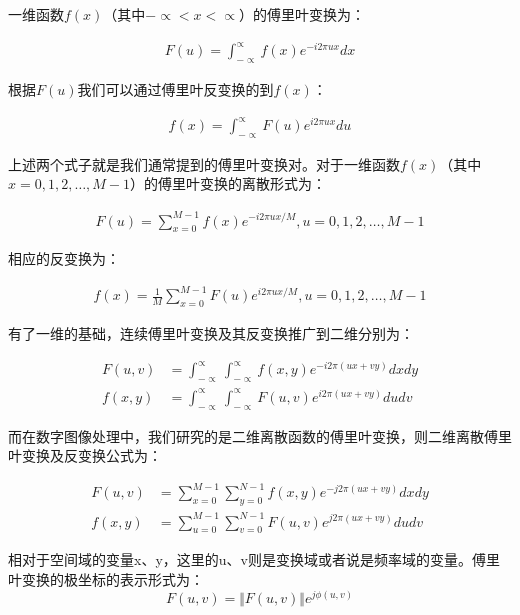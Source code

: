 一维函数$f(x)$（其中$-\propto<x<\propto$）的傅里叶变换为：
\begin{linenomath}
\begin{align}
F(u)=\int^{\propto}_{-\propto}f(x)e^{-i2\pi ux}dx
\label{式2_14}
\end{align}
\end{linenomath}
根据$F(u)$我们可以通过傅里叶反变换的到$f(x)$：
\begin{linenomath}
\begin{align}
f(x)=\int^{\propto}_{-\propto}F(u)e^{i2\pi ux}du
\label{式2_15}
\end{align}
\end{linenomath}
上述两个式子就是我们通常提到的傅里叶变换对。对于一维函数$f(x)$（其中$x=0,1,2,\dots,M-1$）的傅里叶变换的离散形式为：
\begin{linenomath}
\begin{align}
F(u)=\sum^{M-1}_{x=0}f(x)e^{-i2\pi ux/M}, u=0,1,2,\dots,M-1
\label{式2_16}
\end{align}
\end{linenomath}
相应的反变换为：
\begin{linenomath}
\begin{align}
f(x)=\frac{1}{M}\sum^{M-1}_{x=0}F(u)e^{i2\pi ux/M},u=0,1,2,\dots,M-1
\label{式2_17}
\end{align}
\end{linenomath}
有了一维的基础，连续傅里叶变换及其反变换推广到二维分别为：
\begin{linenomath}
\begin{align}
F(u,v) &= \int^{\propto}_{-\propto}\int^{\propto}_{-\propto}f(x,y)e^{-i2\pi (ux+vy)}dxdy\label{式2_18}\\
f(x,y) &= \int^{\propto}_{-\propto}\int^{\propto}_{-\propto}F(u,v)e^{i2\pi (ux+vy)}dudv\label{式2_19}
\end{align}
\end{linenomath}
而在数字图像处理中，我们研究的是二维离散函数的傅里叶变换，则二维离散傅里叶变换及反变换公式为：
\begin{linenomath}
\begin{align}
F(u,v) &= \sum^{M-1}_{x=0}\sum^{N-1}_{y=0}f(x,y)e^{-j2\pi (ux+vy)}dxdy\label{式2_20}\\
f(x,y) &= \sum^{M-1}_{u=0}\sum^{N-1}_{v=0}F(u,v)e^{j2\pi (ux+vy)}dudv\label{式2_21}
\end{align}
\end{linenomath}
相对于空间域的变量x、y，这里的u、v则是变换域或者说是频率域的变量。傅里叶变换的极坐标的表示形式为：
\begin{equation}
F(u,v)=\Vert F(u,v)\Vert e^{j\phi(u,v)}
\label{式2_22}
\end{equation}
